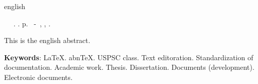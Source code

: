 \documentclass[_ArquivoPrincipal.tex]{subfiles}
\begin{document}
	\begin{resumo}[Abstract]
		\begin{otherlanguage*}{english}
			\begin{flushleft} 
				\setlength{\absparsep}{0pt} %
				\SingleSpacing 
				\imprimirautorabr~ ~\textbf{\imprimirtitleabstract}.	\imprimirdata.  \pageref{LastPage}p. 
				\imprimirtipotrabalho~-~\imprimirinstituicao, \imprimirlocal, 	\imprimirdata. 
			\end{flushleft}
			\OnehalfSpacing 
			This is the english abstract.
			
			\vspace{\onelineskip}
			
			\noindent 
			\textbf{Keywords}: LaTeX. abnTeX. USPSC class. Text editoration. Standardization of documentation. Academic work. Thesis. Dissertation. Documents (development). Electronic documents.
		\end{otherlanguage*}
	\end{resumo}
\end{document}
